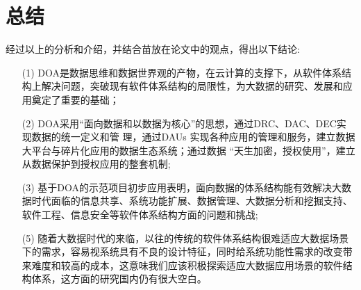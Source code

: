 \documentclass[article]{BJTU-thesis}
\begin{document}
	\section{总结}
	经过以上的分析和介绍，并结合苗放在论文\cite{apriori}中的观点，得出以下结论:
	\begin{enumerate}
		\item[(1)] DOA是数据思维和数据世界观的产物，在云计算的支撑下，从软件体系结构上解决问题，突破现有软件体系结构的局限性，为大数据的研究、发展和应用奠定了重要的基础；
		\item[(2)] DOA采用“面向数据和以数据为核心”的思想，通过DRC、DAC、DEC实现数据的统一定义和管
		理，通过DAUs 实现各种应用的管理和服务，建立数据大平台与碎片化应用的数据生态系统；通过数据
		“天生加密，授权使用”，建立从数据保护到授权应用的整套机制;
		\item[(3)] 基于DOA的示范项目初步应用表明，面向数据的体系结构能有效解决大数据时代面临的信息共享、系统功能扩展、数据管理、大数据分析和挖掘支持、软件工程、信息安全等软件体系结构方面的问题和挑战;
		\item[(5)] 随着大数据时代的来临，以往的传统的软件体系结构很难适应大数据场景下的需求，容易视系统具有不良的设计特征，同时给系统功能性需求的改变带来难度和较高的成本，这意味我们应该积极探索适应大数据应用场景的软件结构体系，这方面的研究国内仍有很大空白。
	\end{enumerate}
	
	
	
\end{document}
